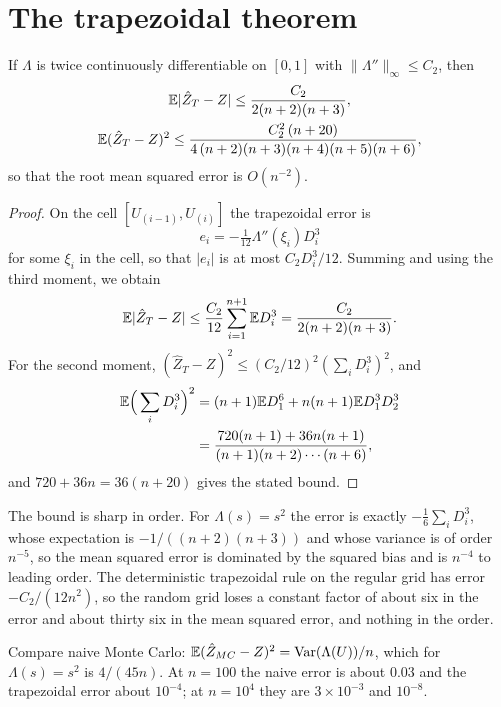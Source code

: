 \section{The trapezoidal theorem}

\begin{theorem}
If $\Lambda$ is twice continuously differentiable on $[0, 1]$ with $\|\Lambda''\|_\infty \le C_2$, then
\[
\begin{gathered}
\mathbb{E} | \hat Z_T - Z | \le \frac{C_2}{2 (n+2)(n+3)} , \\
\mathbb{E} ( \hat Z_T - Z )^2 \le \frac{C_2^2 \, (n + 20)}{4 \, (n+2)(n+3)(n+4)(n+5)(n+6)} ,
\end{gathered}
\]
so that the root mean squared error is $O(n^{-2})$.
\end{theorem}

\begin{proof}
On the cell $[U_{(i-1)}, U_{(i)}]$ the trapezoidal error is
\[
e_i = -\tfrac{1}{12} \Lambda''(\xi_i) D_i^3
\]
for some $\xi_i$ in the cell, so that $|e_i|$ is at most $C_2 D_i^3 / 12$. Summing and using the third moment, we obtain
\[
\mathbb{E} |\hat Z_T - Z| \le \frac{C_2}{12} \sum_{i=1}^{n+1} \mathbb{E} D_i^3 = \frac{C_2}{2(n+2)(n+3)} .
\]
For the second moment, $(\hat Z_T - Z)^2 \le (C_2/12)^2 (\sum_i D_i^3)^2$, and
\[
\begin{aligned}
\mathbb{E} \Big( \sum_i D_i^3 \Big)^2 &= (n+1) \mathbb{E} D_1^6 + n(n+1) \mathbb{E} D_1^3 D_2^3 \\ &= \frac{ 720 (n+1) + 36 n (n+1) }{ (n+1)(n+2) \cdots (n+6) } ,
\end{aligned}
\]
and $720 + 36 n = 36 (n + 20)$ gives the stated bound.
\end{proof}

The bound is sharp in order. For $\Lambda(s) = s^2$ the error is exactly $-\tfrac{1}{6} \sum_i D_i^3$, whose expectation is $-1/((n+2)(n+3))$ and whose variance is of order $n^{-5}$, so the mean squared error is dominated by the squared bias and is $n^{-4}$ to leading order. The deterministic trapezoidal rule on the regular grid has error $-C_2 / (12 n^2)$, so the random grid loses a constant factor of about six in the error and about thirty six in the mean squared error, and nothing in the order.

Compare naive Monte Carlo: $\mathbb{E}(\hat Z_{MC} - Z)^2 = \operatorname{Var}(\Lambda(U)) / n$, which for $\Lambda(s) = s^2$ is $4/(45 n)$. At $n = 100$ the naive error is about $0.03$ and the trapezoidal error about $10^{-4}$; at $n = 10^4$ they are $3 \times 10^{-3}$ and $10^{-8}$.

